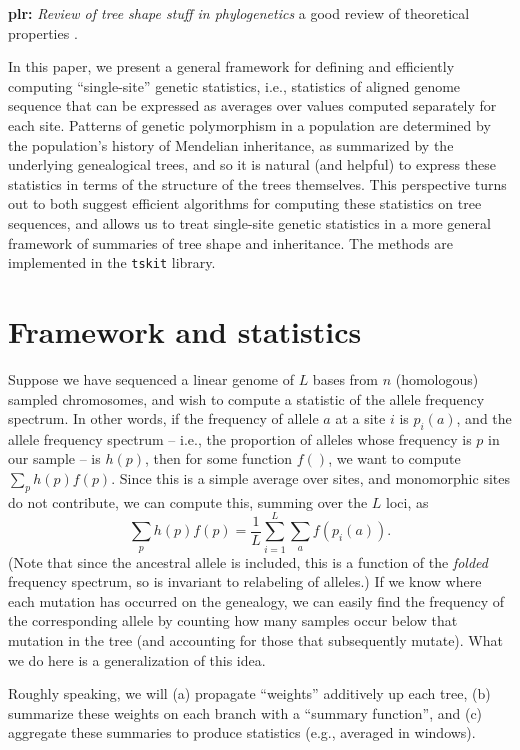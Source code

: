 \documentclass{article}
\newcommand{\tskit}{{\texttt{tskit}}}
\newcommand{\plr}[1]{{\color{blue}\textbf{plr:} \it #1}}
\begin{document}
\plr{Review of tree shape stuff in phylogenetics}
a good review of theoretical properties \citet{semple2003phylogenetics}.

In this paper, we present a general framework for defining and efficiently computing
``single-site'' genetic statistics,
i.e., statistics of aligned genome sequence that can be expressed as averages over values computed
separately for each site.
Patterns of genetic polymorphism in a population
are determined by the population's history of Mendelian inheritance,
as summarized by the underlying genealogical trees,
and so it is natural (and helpful) to express these statistics
in terms of the structure of the trees themselves.
This perspective turns out to both suggest efficient algorithms
for computing these statistics on tree sequences,
and allows us to treat single-site genetic statistics in a more general framework
of summaries of tree shape and inheritance.
The methods are implemented in the \tskit{} library.

\section*{Framework and statistics}


Suppose we have sequenced a linear genome of $L$ bases from $n$ (homologous) sampled chromosomes,
and wish to compute a statistic of the allele frequency spectrum.
In other words, if the frequency of allele $a$ at a site $i$ is $p_i(a)$,
and the allele frequency spectrum
-- i.e., the proportion of alleles whose frequency is $p$ in our sample -- is $h(p)$,
then for some function $f()$, we want to compute $\sum_p h(p) f(p)$.
Since this is a simple average over sites, and monomorphic sites do not contribute,
we can compute this, summing over the $L$ loci, as
$$\sum_p h(p) f(p) = \frac{1}{L} \sum_{i=1}^L \sum_a f(p_i(a)).$$
(Note that since the ancestral allele is included, this is a function of the
\emph{folded} frequency spectrum, so is invariant to relabeling of alleles.)
If we know where each mutation has occurred on the genealogy,
we can easily find the frequency of the corresponding allele by counting how many samples
occur below that mutation in the tree (and accounting for those that subsequently mutate).
What we do here is a generalization of this idea.


Roughly speaking, we will
(a) propagate ``weights'' additively up each tree,
(b) summarize these weights on each branch with a ``summary function'',
and (c) aggregate these summaries to produce statistics
(e.g., averaged in windows).
\end{document}
